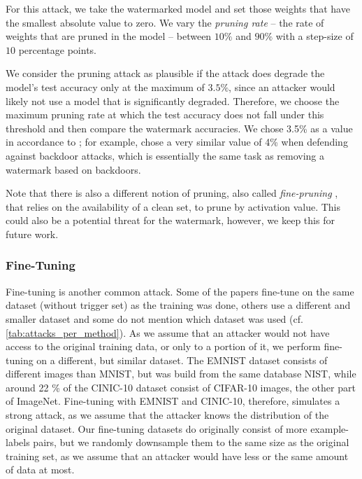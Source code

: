 For this attack, we take the watermarked model and set those weights that have the smallest absolute value to zero. We vary the \textit{pruning rate} -- the rate of weights that are pruned in the model -- between $10\%$ and $90\%$ with a step-size of $10$ percentage points.

We consider the pruning attack as plausible if the attack does degrade the model's test accuracy only at the maximum of $3.5\%$, since an attacker would likely not use a model that is significantly degraded. Therefore, we choose the maximum pruning rate at which the test accuracy does not fall under this threshold and then compare the watermark accuracies. We chose 3.5\% as a value in accordance to \cite{liu_trojaning_2017}; for example, \cite{liu_fine-pruning_2018} chose a very similar value of 4\% when defending against backdoor attacks, which is essentially the same task as removing a watermark based on backdoors.

Note that there is also a different notion of pruning, also called \textit{fine-pruning} \cite{liu_fine-pruning_2018}, that relies on the availability of a clean set, to prune by activation value. This could also be a potential threat for the watermark, however, we keep this for future work.

\subsubsection{Fine-Tuning} \label{sec:finetuning}

Fine-tuning is another common attack. Some of the papers fine-tune on the same dataset (without trigger set) as the training was done, others use a different and smaller dataset and some do not mention which dataset was used (cf. \cref{tab:attacks_per_method}). As we assume that an attacker would not have access to the original training data, or only to a portion of it, we perform fine-tuning on a different, but similar dataset. The EMNIST dataset consists of different images than MNIST, but was build from the same database NIST, while around 22 \% of the CINIC-10 dataset consist of CIFAR-10 images, the other part of ImageNet. Fine-tuning with EMNIST and CINIC-10, therefore, simulates a strong attack, as we assume that the attacker knows the distribution of the original dataset. Our fine-tuning datasets do originally consist of more example-labels pairs, but we randomly downsample them to the same size as the original training set, as we assume that an attacker would have less or the same amount of data at most. 

